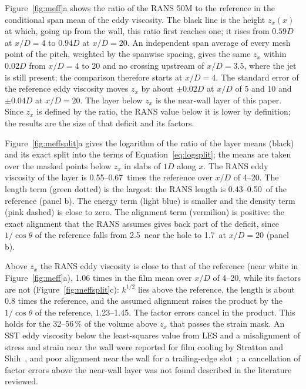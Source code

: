 \documentclass[colorlinks,upint,subscriptcorrection,varvw,hyphenate,balance,lineno]{asmeconf}
\newcommand*{\xEVstart}{4}%
\newcommand*{\zxStart}{0.59}%
\newcommand*{\zxEnd}{0.94}%
\newcommand*{\muNearLow}{0.55}%
\newcommand*{\muNearHigh}{0.67}%
\newcommand*{\Lnear}{0.43--0.50}%
\newcommand*{\cosNearStart}{2.5}%
\newcommand*{\cosNearEnd}{1.7}%
\begin{document}
Figure~\ref{fig:meff}a shows the ratio of the RANS 50M to the reference in the conditional span mean of the eddy
viscosity. The black line is the height $z_x(x)$ at which, going up from the
wall, this ratio first reaches one; it rises from $\zxStart D$ at $x/D=\xEVstart$ to $\zxEnd D$ at $x/D=20$. An
independent span average of every mesh point of the pitch, weighted by the spanwise spacing, gives the same $z_x$
within $0.02D$ from $x/D=4$ to 20 and no crossing upstream of $x/D=3.5$, where the jet is still present; the
comparison therefore starts at $x/D=\xEVstart$. The standard error of the reference eddy viscosity moves $z_x$ by about
$\pm0.02D$ at $x/D$ of 5 and 10 and $\pm0.04D$ at $x/D=20$. The layer below $z_x$ is the near-wall layer of this
paper. Since $z_x$ is defined by the ratio, the RANS value below it is lower by definition; the results are the
size of that deficit and its factors.

Figure~\ref{fig:meffsplit}a gives the logarithm of the ratio of the layer means (black) and its exact split into
the terms of Equation~\ref{eq:logsplit}; the means are taken over the masked points below $z_x$ in slabs of $1D$
along $x$. The RANS eddy viscosity of the layer is \muNearLow--\muNearHigh\ times the
reference over $x/D$ of \xEVstart--20. The length term (green dotted) is the largest: the RANS length is \Lnear\
of the reference (panel b). The energy term (light blue) is smaller and the density term (pink dashed) is close to
zero. The alignment term (vermilion) is positive: the exact alignment that the RANS assumes gives back part of
the deficit, since $1/\cos\theta$ of the reference falls from \cosNearStart\ near the hole to \cosNearEnd\ at
$x/D=20$ (panel b).

Above $z_x$ the RANS eddy viscosity is close to that of the reference (near white in Figure~\ref{fig:meff}a),
1.06 times in the film mean over $x/D$ of \xEVstart--20, while its factors are not
(Figure~\ref{fig:meffsplit}c): $k^{1/2}$ lies above the reference, the length is about 0.8 times the reference,
and the assumed alignment raises the product by the $1/\cos\theta$ of the reference, 1.23--1.45. The factor
errors cancel in the product. This holds for the 32--56\,\% of the volume above $z_x$ that passes the strain mask. An
SST eddy viscosity below the least-squares value from LES and a misalignment of stress and strain near the wall
were reported for film cooling by Stratton and Shih~\cite{stratton2019}, and poor alignment near the wall for a
trailing-edge slot~\cite{sandberg2018}; a cancellation of factor errors above the near-wall layer was not found
described in the literature reviewed.
\end{document}
